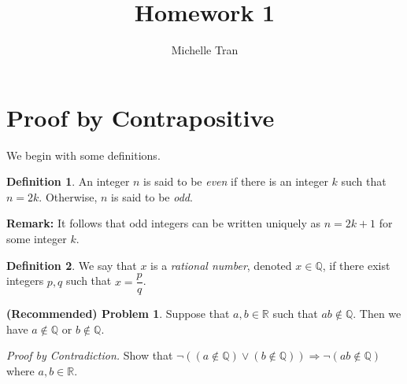 \documentclass[a4paper,11pt]{article}
\author{Michelle Tran}
\title{Homework 1}
\begin{document}
\maketitle

\newtheorem{prop}{Proposition}[section]
\newtheorem{thm}{Theorem}[section]
\newtheorem{lemma}{Lemma}[section]
\newtheorem{cor}{Corollary}[prop]

\theoremstyle{definition}
\newtheorem{mydef}{Definition}

\theoremstyle{definition}
\newtheorem{required}{(Recommended) Problem}

\theoremstyle{definition}
\newtheorem{advanced}[required]{(Advanced) Problem}

\theoremstyle{definition}
\newtheorem{challenge}[required]{(Challenge) Problem}

\theoremstyle{definition}
\newtheorem{open}{(Open) Problem}

\theoremstyle{definition}
\newtheorem{ex}{Example}


\section{Proof by Contrapositive} 

\noindent We begin with some definitions.

\begin{mydef}
An integer $n$ is said to be \textit{even} if there is an integer $k$ such that $n = 2k$. Otherwise, $n$ is said to be \textit{odd}.
\end{mydef}

\noindent \textbf{Remark:} It follows that odd integers can be written uniquely as $n = 2k+1$ for some integer $k$. 

\noindent
\begin{mydef}
We say that $x$ is a \textit{rational number}, denoted $x \in \mathbb{Q}$, if there exist integers $p, q$ such that $x = \dfrac{p}{q}$.
\end{mydef}


\noindent 
\begin{required}
Suppose that $a, b \in \mathbb{R}$ such that $ab \not \in \mathbb{Q}$. Then we have $a \not \in \mathbb{Q}$ or $b \not \in \mathbb{Q}$.
\end{required}

\emph{Proof by Contradiction.} Show that $\neg ((a \not \in \mathbb{Q}) \vee (b \not \in \mathbb{Q})) \Rightarrow \neg (ab \not \in \mathbb{Q})$ where $a,b \in \mathbb{R}.$
\end{document}

